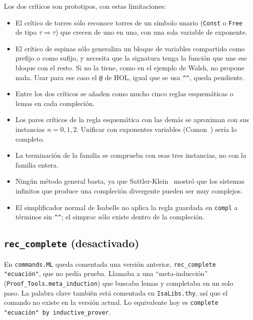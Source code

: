 \documentclass[11pt,a4paper]{article}
\newcommand{\isa}[1]{\texttt{#1}}
\theoremstyle{definition}
\theoremstyle{remark}
\begin{document}
Los dos críticos son prototipos, con estas limitaciones:
\begin{itemize}[nosep]
  \item El crítico de torres sólo reconoce torres de un símbolo unario
        (\isa{Const} o \isa{Free} de tipo $\tau \Rightarrow \tau$) que crecen de
        uno en uno, con una sola variable de exponente.
  \item El crítico de espinas sólo generaliza un bloque de variables compartido
        como prefijo o como sufijo, y necesita que la signatura tenga la función
        que une ese bloque con el resto. Si no la tiene, como en el ejemplo de
        Walsh, no propone nada. Usar para ese caso el \isa{@} de HOL, igual que se
        usa \isa{\textasciicircum\textasciicircum}, queda pendiente.
  \item Entre los dos críticos se añaden como mucho cinco reglas esquemáticas o
        lemas en cada compleción.
  \item Los pares críticos de la regla esquemática con las demás se aproximan con
        sus instancias $n = 0, 1, 2$. Unificar con exponentes variables
        (Comon~\cite{comon95}) sería lo completo.
  \item La terminación de la familia se comprueba con esas tres instancias, no con
        la familia entera.
  \item Ningún método general basta, ya que Sattler-Klein~\cite{sattler-klein}
        mostró que los sistemas infinitos que produce una compleción divergente pueden
        ser muy complejos.
  \item El simplificador normal de Isabelle no aplica la regla guardada en
        \isa{compl} a términos sin \isa{\textasciicircum\textasciicircum}; el simproc
        sólo existe dentro de la compleción.
\end{itemize}

\subsection{\texttt{rec\_complete} (desactivado)}

En \isa{commands.ML} queda comentada una versión anterior,
\isa{rec\_complete "ecuación"}, que no pedía prueba. Llamaba a una ``meta-inducción''
(\isa{Proof\_Tools.meta\_induction}) que buscaba lemas y completaba en un solo paso.
La palabra clave también está comentada en \isa{IsaLibs.thy}, así que el comando no
existe en la versión actual. Lo equivalente hoy es
\isa{complete "ecuación" by inductive\_prover}.
\end{document}
